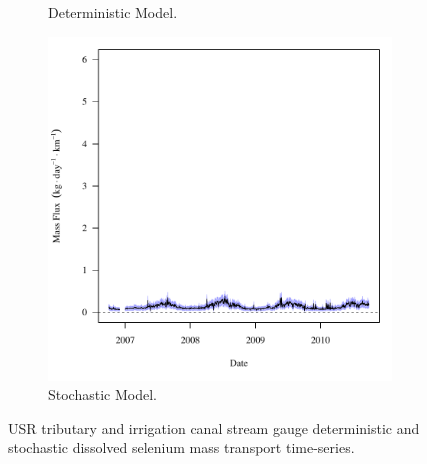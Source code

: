 \begin{linenumbers}
\begin{landscape}
\begin{figure}
\begin{subfigure}{0.7\textwidth}
			\caption{Deterministic Model.}
		\end{subfigure}%
		\begin{subfigure}{0.7\textwidth}
			\centering
			\includegraphics[width=\tableCustomSize]{"Figures/Results_USR/Stochastic/f WTP"}
			\caption{Stochastic Model.}
		\end{subfigure}
		\caption{USR tributary and irrigation canal stream gauge deterministic and stochastic dissolved selenium mass transport time-series.}
	\end{figure}
\end{landscape}




\end{linenumbers}
